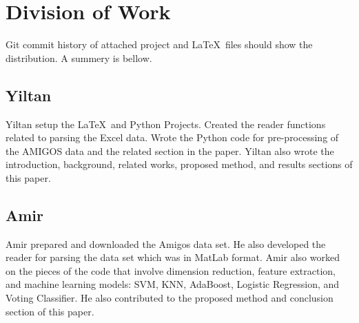 \section{Division of Work}
\label{sec:division_of_work}
Git commit history of attached project and
\LaTeX~files should show the distribution.
A summery is bellow.

\subsection{Yiltan}
Yiltan setup the \LaTeX~and Python Projects.
Created the reader functions related to parsing the Excel data.
Wrote the Python code for pre-processing of the AMIGOS data
and the related section in the paper.
Yiltan also wrote the introduction, background, related works,
proposed method, and results sections of this paper.

\subsection{Amir}
Amir prepared and downloaded the Amigos data set.
He also developed the reader for parsing the data set
which was in MatLab format.
Amir also worked on the pieces of the code that involve dimension reduction, 
feature extraction, and machine learning models: SVM, KNN, AdaBoost, 
Logistic Regression, and Voting Classifier. He also contributed to the 
proposed method and conclusion section of this paper.
